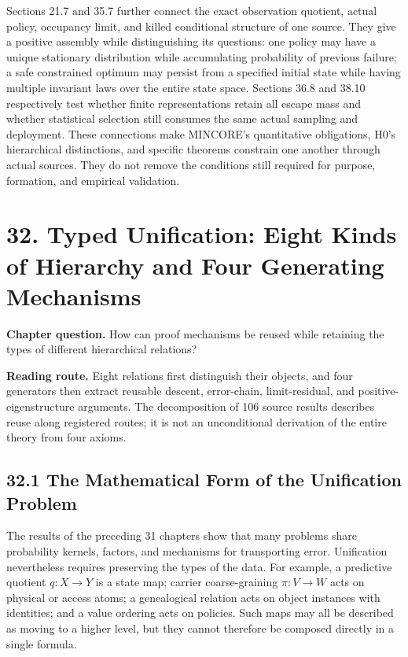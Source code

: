 \documentclass[
  english,
  11pt,
  oneside]{book}
\begin{document}
Sections 21.7 and 35.7 further connect the exact observation quotient, actual policy, occupancy limit, and killed conditional structure of one source. They give a positive assembly while distinguishing its questions: one policy may have a unique stationary distribution while accumulating probability of previous failure; a safe constrained optimum may persist from a specified initial state while having multiple invariant laws over the entire state space. Sections 36.8 and 38.10 respectively test whether finite representations retain all escape mass and whether statistical selection still consumes the same actual sampling and deployment. These connections make MINCORE's quantitative obligations, H0's hierarchical distinctions, and specific theorems constrain one another through actual sources. They do not remove the conditions still required for purpose, formation, and empirical validation.

\chapter{32. Typed Unification: Eight Kinds of Hierarchy and Four Generating Mechanisms}\label{ch-32}

\textbf{Chapter question.} How can proof mechanisms be reused while retaining the types of different hierarchical relations?

\textbf{Reading route.} Eight relations first distinguish their objects, and four generators then extract reusable descent, error-chain, limit-residual, and positive-eigenstructure arguments. The decomposition of 106 source results describes reuse along registered routes; it is not an unconditional derivation of the entire theory from four axioms.

\section{32.1 The Mathematical Form of the Unification Problem}\label{the-mathematical-form-of-the-unification-problem}

The results of the preceding 31 chapters show that many problems share probability kernels, factors, and mechanisms for transporting error. Unification nevertheless requires preserving the types of the data. For example, a predictive quotient \(q:X\to Y\) is a state map; carrier coarse-graining \(\pi:V\to W\) acts on physical or access atoms; a genealogical relation acts on object instances with identities; and a value ordering acts on policies. Such maps may all be described as moving to a higher level, but they cannot therefore be composed directly in a single formula.
\end{document}
